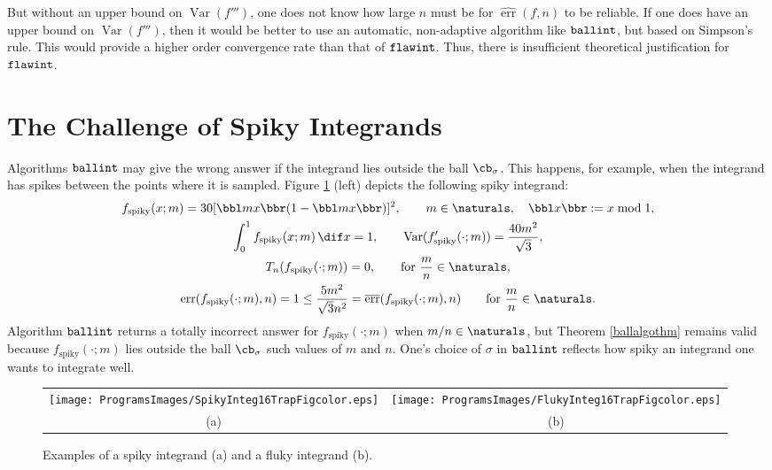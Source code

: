 \documentclass[]{article}
\DeclareMathOperator{\flawinteg}{\texttt{\textup{flawint}}}
\DeclareMathOperator{\ballinteg}{\texttt{\textup{ballint}}}
\DeclareMathOperator{\Var}{Var}
\DeclareMathOperator{\err}{err}
\newcommand{\oerr}{\overline{\err}}
\newcommand{\herr}{\widehat{\err}}
\theoremstyle{definition}
\theoremstyle{remark}
\begin{document}
But without an upper bound on $\Var(f''')$, one does not know how large $n$ must be for $\herr(f,n)$ to be reliable.  If one does have an upper bound on $\Var(f''')$, then it would be better to use an automatic, non-adaptive algorithm like $\ballinteg$, but based on Simpson's rule.  This would provide a higher order convergence rate than that of $\flawinteg$.  Thus, there is insufficient theoretical justification for $\flawinteg$.

\section{The Challenge of Spiky Integrands} \label{spikysec}

Algorithms $\ballinteg$ may give the wrong answer if the integrand lies outside the ball $\cb_{\sigma}$.  This happens, for example, when the integrand has spikes between the points where it is sampled.  Figure \ref{spikeflukefig} (left) depicts the following spiky integrand:
\begin{subequations} \label{spiky}
\begin{gather}
f_{\text{spiky}}(x;m) = 30[\bbl m x \bbr(1-\bbl m x \bbr)]^2, \qquad m \in \naturals, \quad \bbl x \bbr := x \bmod 1, \\
\int_0^1 f_{\text{spiky}}(x;m) \, \dif x = 1, \qquad \Var(f'_{\text{spiky}}(\cdot;m))= \frac{40m^2}{\sqrt{3}},\\
T_n(f_{\text{spiky}}(\cdot;m))=0, \qquad 
\text{for } \frac{m} {n} \in \naturals, \\
\err(f_{\text{spiky}}(\cdot;m),n)=1 \le \frac{5m^2}{\sqrt{3}n^2} = \oerr(f_{\text{spiky}}(\cdot;m),n) \qquad 
\text{for } \frac{m}{n} \in \naturals.
\end{gather}
\end{subequations}
Algorithm $\ballinteg$ returns a totally incorrect answer for $f_{\text{spiky}}(\cdot;m)$ when $m/n \in \naturals$, but Theorem \ref{ballalgothm} remains valid because $f_{\text{spiky}}(\cdot;m)$ lies outside the ball $\cb_{\sigma}$ such values of $m$ and $n$.  One's choice of $\sigma$ in $\ballinteg$ reflects how spiky an integrand one wants to integrate well.

\begin{figure}
\centering 
\begin{tabular}{cc}
\texttt{[image: ProgramsImages/SpikyInteg16TrapFigcolor.eps]} 
&
\texttt{[image: ProgramsImages/FlukyInteg16TrapFigcolor.eps]} \tabularnewline
(a) & (b)
\end{tabular}
\caption{Examples of a spiky integrand (a) and a fluky integrand (b). \label{spikeflukefig}}
\end{figure}
\end{document}
